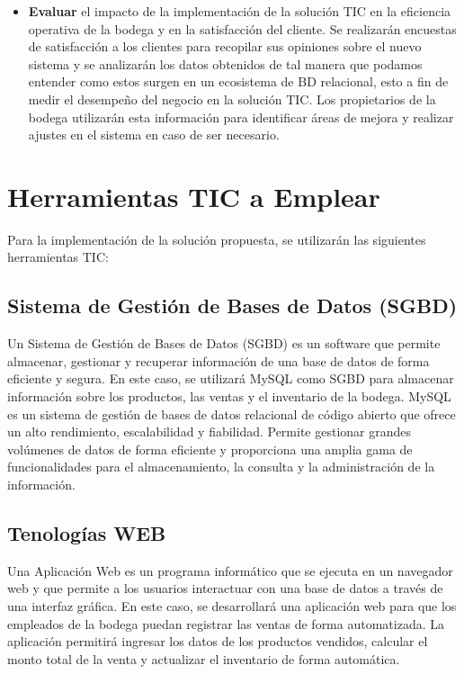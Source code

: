 \documentclass{article}
\begin{document}
\begin{itemize}
      \item \textbf{Evaluar} el impacto de la implementación de la solución TIC en la eficiencia operativa de la bodega y en la satisfacción del cliente. Se realizarán encuestas de satisfacción a los clientes para recopilar sus opiniones sobre el nuevo sistema y se analizarán los datos obtenidos de tal manera que podamos entender como estos surgen en un ecosistema de BD relacional, esto a fin de medir el desempeño del negocio en la solución TIC. Los propietarios de la bodega utilizarán esta información para identificar áreas de mejora y realizar ajustes en el sistema en caso de ser necesario.
    \end{itemize}
    

\newpage

\section{Herramientas TIC a Emplear}

  Para la implementación de la solución propuesta, se utilizarán las siguientes herramientas TIC:

  \subsection{Sistema de Gestión de Bases de Datos (SGBD)}

    Un Sistema de Gestión de Bases de Datos (SGBD) es un software que permite almacenar, gestionar y recuperar información de una base de datos de forma eficiente y segura. En este caso, se utilizará MySQL como SGBD para almacenar información sobre los productos, las ventas y el inventario de la bodega. MySQL es un sistema de gestión de bases de datos relacional de código abierto que ofrece un alto rendimiento, escalabilidad y fiabilidad. Permite gestionar grandes volúmenes de datos de forma eficiente y proporciona una amplia gama de funcionalidades para el almacenamiento, la consulta y la administración de la información.

\vspace{-0.5cm}
  \subsection{Tenologías WEB}

    Una Aplicación Web es un programa informático que se ejecuta en un navegador web y que permite a los usuarios interactuar con una base de datos a través de una interfaz gráfica. En este caso, se desarrollará una aplicación web para que los empleados de la bodega puedan registrar las ventas de forma automatizada. La aplicación permitirá ingresar los datos de los productos vendidos, calcular el monto total de la venta y actualizar el inventario de forma automática.
\end{document}
